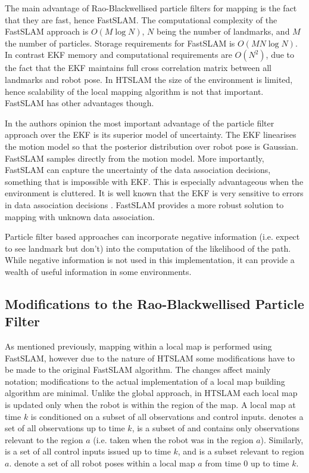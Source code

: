 The main advantage of Rao-Blackwellised particle filters for mapping
is the fact that they are fast, hence FastSLAM. The computational
complexity of the FastSLAM approach is $O(M \log N)$, $N$ being the
number of landmarks, and $M$ the number of particles. Storage
requirements for FastSLAM is $O(M N \log N)$. In contrast EKF memory
and computational requirements are $O(N^2)$, due to the fact that the
EKF maintains full cross correlation matrix between all landmarks and
robot pose. In HTSLAM the size of the environment is limited, hence
scalability of the local mapping algorithm is not that
important. FastSLAM has other advantages though.

In the authors opinion the most important advantage of the particle
filter approach over the EKF is its superior model of uncertainty. The
EKF linearises the motion model so that the posterior distribution
over robot pose is Gaussian. FastSLAM samples directly from the motion
model. More importantly, FastSLAM can capture the uncertainty of the
data association decisions, something that is impossible with EKF.
This is especially advantageous when the environment is cluttered. It
is well known that the EKF is very sensitive to errors in data association
decisions \cite{neira01:_data_assoc_stoch_mappin_using}. FastSLAM
provides a more robust solution to mapping with unknown data
association.

Particle filter based approaches can incorporate negative information
(i.e. expect to see landmark but don't) into the computation of the
likelihood of the path. While negative information is not used in this
implementation, it can provide a wealth of useful information in some
environments.


\subsection{Modifications to the Rao-Blackwellised Particle Filter}


As mentioned previously, mapping within a local map is performed using
FastSLAM, however due to the nature of HTSLAM some modifications have
to be made to the original FastSLAM algorithm. The changes affect
mainly notation; modifications to the actual implementation of a local
map building algorithm are minimal.  Unlike the global approach, in
HTSLAM each local map is updated only when the robot is within the
region of the map. A local map at time $k$ is conditioned on a subset
of all observations and control inputs.  denotes a set of
all observations up to time $k$,  is a subset of 
and contains only observations relevant to the region $a$ (i.e. taken
when the robot was in the region $a$). Similarly,  is a set
of all control inputs issued up to time $k$, and  is a
subset relevant to region $a$.  denote a set of all robot
poses within a local map $a$ from time $0$ up to time $k$.

